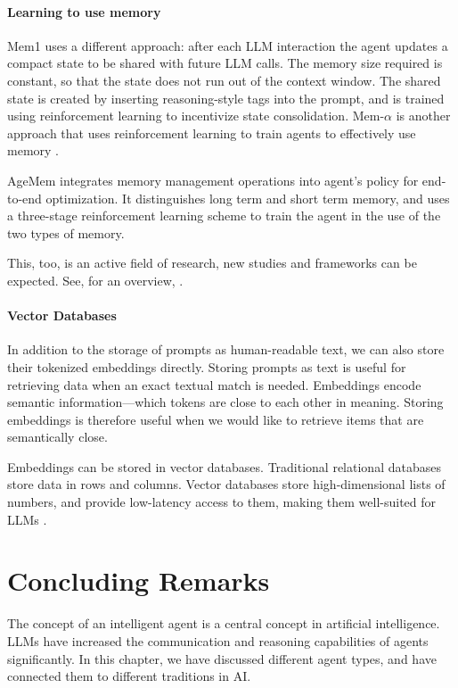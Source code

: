 \paragraph{Learning to use memory}
Mem1 \citep{zhou2025mem1} uses a different approach: after each LLM interaction the agent updates a compact state to be shared with future LLM calls. The memory size required  is  constant, so that the state does not run out of the context window.  The shared state is created by inserting reasoning-style tags into the prompt, and is trained using reinforcement learning to incentivize state consolidation. Mem-$\alpha$ is another approach that uses reinforcement learning to train agents to effectively use memory \citep{wang2025mem}. 

AgeMem \citep{yu2026agentic} integrates memory management operations into agent's policy for end-to-end optimization. It distinguishes long term and short term memory, and uses a three-stage reinforcement learning scheme to train the agent in the use of the two types of memory.

This, too, is an active field of research, new studies and frameworks can be expected. See, for an overview, \citet{zhou2026we}.


\paragraph{Vector Databases}
In addition to the storage of prompts as human-readable text, we  can also store their tokenized embeddings directly.
Storing prompts as text is useful for retrieving data when an exact textual match is needed. Embeddings encode semantic information---which tokens are close to each other in meaning. Storing embeddings is therefore useful when we would like to retrieve items that are semantically close. 

Embeddings can be stored in vector databases. Traditional relational databases store data in rows and columns. Vector databases store high-dimensional lists of numbers, and provide low-latency access to them, making them well-suited for LLMs \citep{xie2023brief,ma2023comprehensive}. 



\section{Concluding Remarks}
The concept of an intelligent agent  is a central concept in artificial intelligence. LLMs have increased the communication and reasoning capabilities of agents significantly. In this chapter, we have discussed different agent types, and have connected them to different traditions in AI. 

